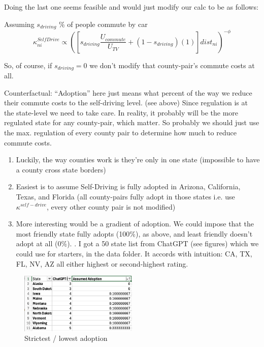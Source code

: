 \documentclass{article}
\begin{document}
Doing the last one seems feasible and would just modify our calc to be as follows:

Assuming $s_{driving}$ \% of people commute by car
$$\kappa^{SelfDrive}_{ni} \propto ( [s_{driving}\frac{U_{commute}}{U_{TV}}  + (1-s_{driving}) (1) ] dist_{ni} ) ^{-\phi}$$

So, of course, if $s_{driving}=0$ we don't modify that county-pair's commute costs at all. 


Counterfactual:
 ``Adoption'' here just means what percent of the way we reduce their commute costs to the self-driving level. (see above)
 Since regulation is at the state-level we need to take care.
 In reality, it probably will be the more regulated state for any county-pair, which matter.
 So probably we should just use the max. regulation of every county pair to determine how much to reduce commute costs. 
\begin{enumerate}
    \item Luckily, the way counties work is they're only in one state (impossible to have a county cross state borders)
\item Easiest is to assume Self-Driving is fully adopted in Arizona, California, Texas, and Florida (all county-pairs fully adopt in those states i.e. use $\kappa^{self-drive}$, every other county pair is not modified)
\item More interesting would be a gradient of adoption. We could impose that the most friendly state fully adopts (100\%), as above, and least friendly doesn't adopt at all (0\%). . I got a 50 state list from ChatGPT (see figures) which we could use for starters, in the data folder. It accords with intuition: CA, TX, FL, NV, AZ all either highest or second-highest rating.

\end{enumerate}

\begin{figure}
        \centering
        \includegraphics[width=0.5\textwidth]{img/strict.png}
        \caption{Strictest / lowest adoption}
\end{figure}
\end{document}
